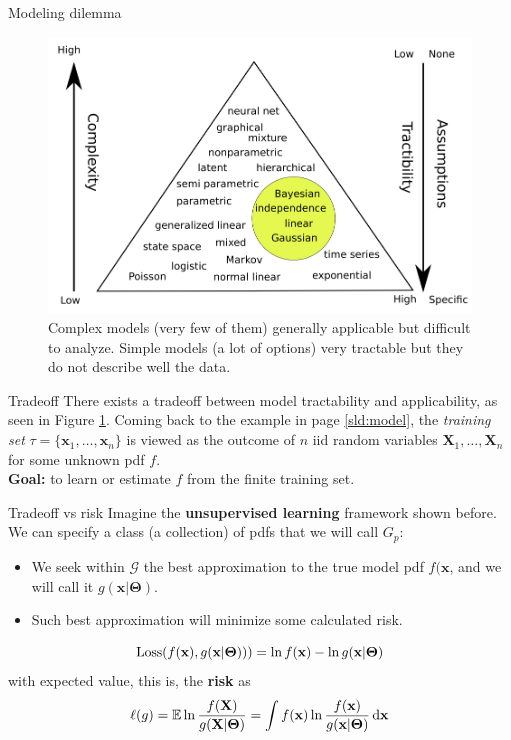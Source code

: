 \documentclass{beamer}
\begin{document}
\begin{frame}{Modeling dilemma}
  \begin{figure}
    \includegraphics[width=0.7\linewidth]{dilemma}
    \caption{Complex models (very few of them) generally applicable but difficult to analyze. Simple models (a lot of options) very tractable but they do not describe well the data\cite{kroese2020}.}
    \label{fig:dilemma}
  \end{figure}
\end{frame}


\begin{frame}{Tradeoff}
  There exists a tradeoff between model tractability and applicability, as seen in Figure \ref{fig:dilemma}. Coming back to the example in page \ref{sld:model}, the {\em training set} $\tau = \{\mathbf{x}_1,\ldots,\mathbf{x}_n\}$ is viewed as the outcome of $n$ iid random variables $\mathbf{X}_1,\ldots,\mathbf{X}_n$ for some unknown pdf $f$.\\[2ex]

  {\bf Goal:} to learn or estimate $f$ from the finite training set.
\end{frame}

\begin{frame}{Tradeoff vs risk}
  Imagine the {\bf unsupervised learning} framework shown before. We can specify a class (a collection) of pdfs  that we will call $G_p$:
  \begin{itemize}
    \item We seek within $\mathcal{G}$ the best approximation to the true model pdf $f(\mathbf{x}$, and we will call it $g(\mathbf{x}|\mathbf{\Theta})$. 
    \item Such best approximation will minimize some calculated risk.
  \end{itemize}
  \[
    \mathrm{Loss}(f(\textbf{x}),g(\textbf{x}|\mathbf{\Theta})))=\ln f(\textbf{x}) - \ln g(\textbf{x}|\mathbf{\Theta})
    \]
    with expected value, this is, the {\bf risk} as
    \[
    \ell(g)= \mathbb{E}  \ln \frac{f(\textbf{X})}{g(\mathbf{X}|\mathbf{\Theta})} = \int f(\textbf{x}) \ln \frac{f(\textbf{x})}{g(\textbf{x}|\mathbf{\Theta})} \mathop{}\!\mathrm{d} \textbf{x}
    \]
\end{frame}
\end{document}
